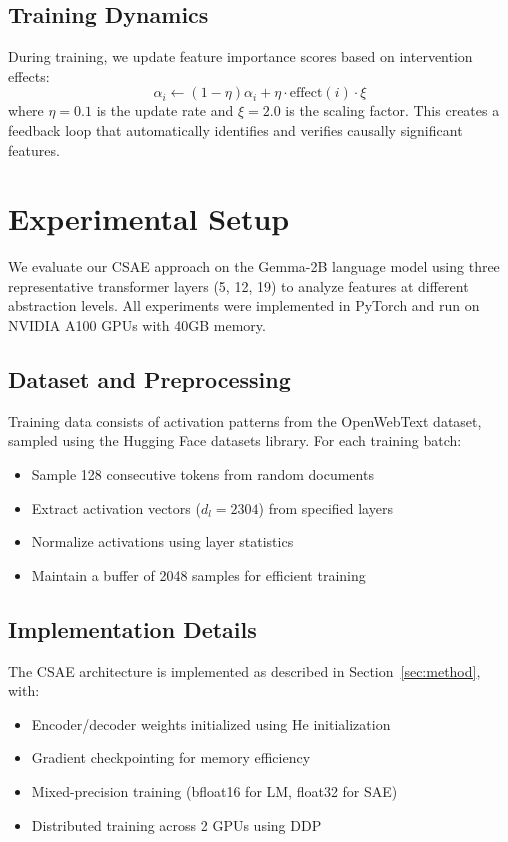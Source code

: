 \documentclass{article} %
\begin{document}
\subsection{Training Dynamics}
During training, we update feature importance scores based on intervention effects:
\begin{equation}
    \alpha_i \leftarrow (1-\eta)\alpha_i + \eta\cdot\text{effect}(i)\cdot\xi
\end{equation}
where $\eta=0.1$ is the update rate and $\xi=2.0$ is the scaling factor. This creates a feedback loop that automatically identifies and verifies causally significant features.

\section{Experimental Setup}
\label{sec:experimental}

We evaluate our CSAE approach on the Gemma-2B language model using three representative transformer layers (5, 12, 19) to analyze features at different abstraction levels. All experiments were implemented in PyTorch and run on NVIDIA A100 GPUs with 40GB memory.

\subsection{Dataset and Preprocessing}
Training data consists of activation patterns from the OpenWebText dataset, sampled using the Hugging Face datasets library. For each training batch:
\begin{itemize}
    \item Sample 128 consecutive tokens from random documents
    \item Extract activation vectors ($d_l=2304$) from specified layers
    \item Normalize activations using layer statistics
    \item Maintain a buffer of 2048 samples for efficient training
\end{itemize}

\subsection{Implementation Details}
The CSAE architecture is implemented as described in Section~\ref{sec:method}, with:
\begin{itemize}
    \item Encoder/decoder weights initialized using He initialization
    \item Gradient checkpointing for memory efficiency
    \item Mixed-precision training (bfloat16 for LM, float32 for SAE)
    \item Distributed training across 2 GPUs using DDP
\end{itemize}
\end{document}
